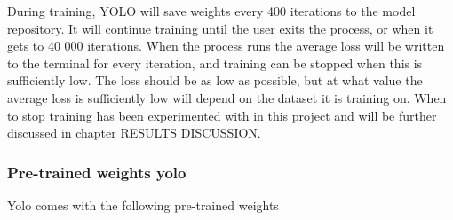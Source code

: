 During training, YOLO will save weights every 400 iterations to the model repository. It will continue training until the user exits the process, or when it gets to 40 000 iterations. When the process runs the average loss will be written to the terminal for every iteration, and training can be stopped when this is sufficiently low. The loss should be as low as possible, but at what value the average loss is sufficiently low will depend on the dataset it is training on. When to stop training has been experimented with in this project and will be further discussed in chapter RESULTS DISCUSSION.

\newpage

\subsubsection{Pre-trained weights yolo}
Yolo comes with the following pre-trained weights

